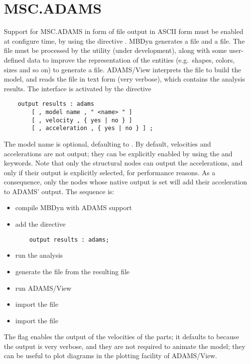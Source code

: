 \section{MSC.ADAMS}
Support for MSC.ADAMS in form of  file output 
in ASCII form must be enabled at configure time, by using 
the directive .
MBDyn generates a  file and a  file.
The  file must be processed by the utility  
(under development), along with some user-defined data to improve
the representation of the entities (e.g.\ shapes, colors, sizes
and so on) to generate a  file.
ADAMS/View interprets the  file to build the model,
and reads the  file in text form (very verbose),
which contains the analysis results.
The interface is activated by the directive
\begin{verbatim}
    output results : adams
        [ , model name , " <name> " ]
        [ , velocity , { yes | no } ]
        [ , acceleration , { yes | no } ] ;
\end{verbatim}
The model name is optional, defaulting to .
By default, velocities and accelerations are not output; they can be
explicitly enabled by using the  and 
keywords.
Note that only the  structural nodes can output 
the accelerations, and only if their output is explicitly selected,
for performance reasons.
As a consequence, only the nodes whose native output is set will add 
their acceleration to ADAMS' output.
The sequence is:
\begin{itemize}
\item compile MBDyn with ADAMS support
\item add the directive
\begin{verbatim}
    output results : adams;
\end{verbatim}
\item run the analysis
\item generate the  file from the resulting  file
\item run ADAMS/View
\item import the  file
\item import the  file
\end{itemize}
The  flag enables the output of the velocities 
of the parts; it defaults to  because the output 
is very verbose, and they are not required to animate
the model; they can be useful to plot diagrams in the plotting
facility of ADAMS/View.

